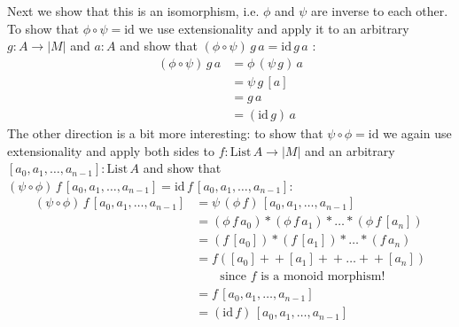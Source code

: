 \documentclass{article}
\newcommand{\Set}{\mathbf{Set}}
\newcommand{\cat}[1]{\underline{\mathbf{#1}}}
\newcommand{\id}{\mathrm{id}}
\newcommand{\List}{\mathrm{List}}
\newcommand{\app}{+\!\!+}
\begin{document}

Next we show that this is an isomorphism, i.e. $\phi$ and $\psi$ are inverse to each other. To show that $\phi \circ \psi = \id$ we use extensionality and apply it to an arbitrary $g : A \to |M|$ and $a : A$ and show that $ (\phi \circ \psi)\,g\,a = \id\,g\,a$ : 
\begin{align*}
  (\phi \circ \psi)\,g\,a
& = \phi\,(\psi\, g)\,a\\
& = \psi\,g\,[a]\\
& = g\,a\\
& = (\id\,g)\,a
\end{align*}
The other direction is a bit more interesting: to show that $\psi \circ \phi = \id$ we again use extensionality and apply both sides to $f : \List\,A \to |M|$ and an arbitrary $[a_0,a_1,\dots,a_{n-1}] : \List\,A$ and show that $(\psi \circ \phi)\,f\,[a_0,a_1,\dots,a_{n-1}]  = \id\,f\,[a_0,a_1,\dots,a_{n-1}]$:
\begin{align*}
  (\psi \circ \phi)\,f\,[a_0,a_1,\dots,a_{n-1}] 
 & = \psi\,(\phi\,f)\, [a_0,a_1,\dots,a_{n-1}] \\
 & = (\phi\,f\,a_0) * (\phi\,f\,a_1) * \dots * (\phi\,f\,[a_n])\\
 & = (f\,[a_0]) * (f\,[a_1]) * \dots * (f\,a_n)\\
 & = f ([a_0] \app [a_1] \app \dots \app [a_n]) \\
 &\qquad \mbox{since $f$ is a monoid morphism!} \\
& = f\, [a_0,a_1,\dots,a_{n-1}] \\
& = (\id\,f)\,[a_0,a_1,\dots,a_{n-1}] 
\end{align*}
\end{document}
